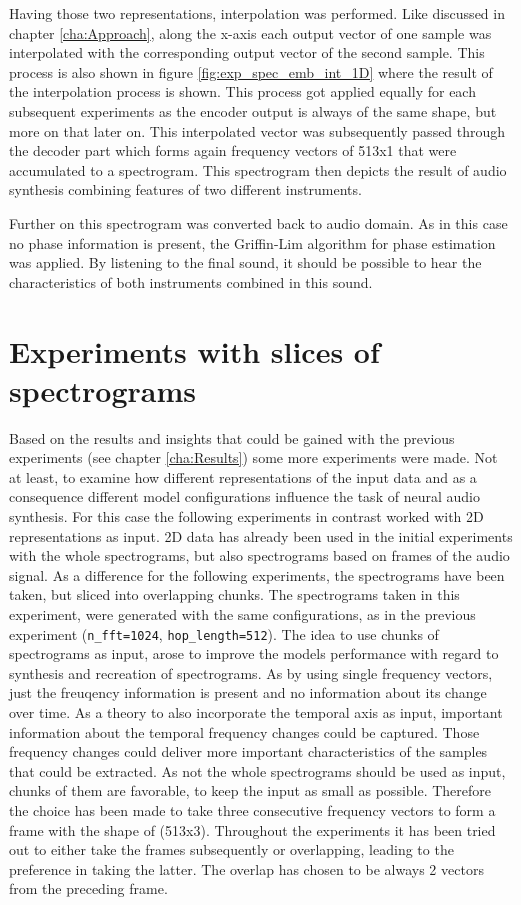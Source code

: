 Having those two representations, interpolation was performed. Like discussed in chapter \ref{cha:Approach}, along the x-axis each output vector of one sample was interpolated with the corresponding output vector of the second sample. This process is also shown in figure \ref{fig:exp_spec_emb_int_1D} where the result of the interpolation process is shown. This process got applied equally for each subsequent experiments as the encoder output is always of the same shape, but more on that later on.
This interpolated vector was subsequently passed through the decoder part which forms again frequency vectors of 513x1 that were accumulated to a spectrogram. This spectrogram then depicts the result of audio synthesis combining features of two different instruments.

Further on this spectrogram was converted back to audio domain. As in this case no phase information is present, the Griffin-Lim algorithm \cite{Griffin1984} for phase estimation was applied. By listening to the final sound, it should be possible to hear the characteristics of both instruments combined in this sound.

\section{Experiments with slices of spectrograms}
\label{sec:exp_spec_slice}
Based on the results and insights that could be gained with the previous experiments (see chapter \ref{cha:Results}) some more experiments were made. Not at least, to examine how different representations of the input data and as a consequence different model configurations influence the task of neural audio synthesis. For this case the following experiments in contrast worked with 2D representations as input. 2D data has already been used in the initial experiments with the whole spectrograms, but also spectrograms based on frames of the audio signal. As a difference for the following experiments, the spectrograms have been taken, but sliced into overlapping chunks. The spectrograms taken in this experiment, were generated with the same configurations, as in the previous experiment (\texttt{n\_fft=1024}, \texttt{hop\_length=512}). The idea to use chunks of spectrograms as input, arose to improve the models performance with regard to synthesis and recreation of spectrograms. As by using single frequency vectors, just the freuqency information is present and no information about its change over time. As a theory to also incorporate the temporal axis as input, important information about the temporal frequency changes could be captured. Those frequency changes could deliver more important characteristics of the samples that could be extracted. As not the whole spectrograms should be used as input, chunks of them are favorable, to keep the input as small as possible. Therefore the choice has been made to take three consecutive frequency vectors to form a frame with the shape of (513x3). Throughout the experiments it has been tried out to either take the frames subsequently or overlapping, leading to the preference in taking the latter. The overlap has chosen to be always 2 vectors from the preceding frame. 

